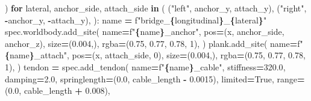 \documentclass[
  american,
  11pt,
  letterpaper,
]{article}
\newenvironment{Shaded}{\begin{snugshade}}{\end{snugshade}}
\newcommand{\BuiltInTok}[1]{#1}
\newcommand{\ControlFlowTok}[1]{\textcolor[rgb]{0.13,0.29,0.53}{\textbf{#1}}}
\newcommand{\DecValTok}[1]{\textcolor[rgb]{0.00,0.00,0.81}{#1}}
\newcommand{\FloatTok}[1]{\textcolor[rgb]{0.00,0.00,0.81}{#1}}
\newcommand{\KeywordTok}[1]{\textcolor[rgb]{0.13,0.29,0.53}{\textbf{#1}}}
\newcommand{\NormalTok}[1]{#1}
\newcommand{\OperatorTok}[1]{\textcolor[rgb]{0.81,0.36,0.00}{\textbf{#1}}}
\newcommand{\SpecialCharTok}[1]{\textcolor[rgb]{0.81,0.36,0.00}{\textbf{#1}}}
\newcommand{\SpecialStringTok}[1]{\textcolor[rgb]{0.31,0.60,0.02}{#1}}
\newcommand{\StringTok}[1]{\textcolor[rgb]{0.31,0.60,0.02}{#1}}
\newcommand{\VariableTok}[1]{\textcolor[rgb]{0.00,0.00,0.00}{#1}}
\renewenvironment{Shaded}{\par\smallskip}{\par\smallskip}
\begin{document}
\begin{Shaded}
\begin{Highlighting}[]
\NormalTok{            )}
        \ControlFlowTok{for}\NormalTok{ lateral, anchor\_side, attach\_side }\KeywordTok{in}\NormalTok{ (}
\NormalTok{            (}\StringTok{"left"}\NormalTok{, anchor\_y, attach\_y),}
\NormalTok{            (}\StringTok{"right"}\NormalTok{, }\OperatorTok{{-}}\NormalTok{anchor\_y, }\OperatorTok{{-}}\NormalTok{attach\_y),}
\NormalTok{        ):}
\NormalTok{            name }\OperatorTok{=} \SpecialStringTok{f"bridge\_}\SpecialCharTok{\{}\NormalTok{longitudinal}\SpecialCharTok{\}}\SpecialStringTok{\_}\SpecialCharTok{\{}\NormalTok{lateral}\SpecialCharTok{\}}\SpecialStringTok{"}
\NormalTok{            spec.worldbody.add\_site(}
\NormalTok{                name}\OperatorTok{=}\SpecialStringTok{f"}\SpecialCharTok{\{}\NormalTok{name}\SpecialCharTok{\}}\SpecialStringTok{\_anchor"}\NormalTok{,}
\NormalTok{                pos}\OperatorTok{=}\NormalTok{(x, anchor\_side, anchor\_z),}
\NormalTok{                size}\OperatorTok{=}\NormalTok{(}\FloatTok{0.004}\NormalTok{,),}
\NormalTok{                rgba}\OperatorTok{=}\NormalTok{(}\FloatTok{0.75}\NormalTok{, }\FloatTok{0.77}\NormalTok{, }\FloatTok{0.78}\NormalTok{, }\DecValTok{1}\NormalTok{),}
\NormalTok{            )}
\NormalTok{            plank.add\_site(}
\NormalTok{                name}\OperatorTok{=}\SpecialStringTok{f"}\SpecialCharTok{\{}\NormalTok{name}\SpecialCharTok{\}}\SpecialStringTok{\_attach"}\NormalTok{,}
\NormalTok{                pos}\OperatorTok{=}\NormalTok{(x, attach\_side, }\DecValTok{0}\NormalTok{),}
\NormalTok{                size}\OperatorTok{=}\NormalTok{(}\FloatTok{0.004}\NormalTok{,),}
\NormalTok{                rgba}\OperatorTok{=}\NormalTok{(}\FloatTok{0.75}\NormalTok{, }\FloatTok{0.77}\NormalTok{, }\FloatTok{0.78}\NormalTok{, }\DecValTok{1}\NormalTok{),}
\NormalTok{            )}
\NormalTok{            tendon }\OperatorTok{=}\NormalTok{ spec.add\_tendon(}
\NormalTok{                name}\OperatorTok{=}\SpecialStringTok{f"}\SpecialCharTok{\{}\NormalTok{name}\SpecialCharTok{\}}\SpecialStringTok{\_cable"}\NormalTok{,}
\NormalTok{                stiffness}\OperatorTok{=}\FloatTok{320.0}\NormalTok{,}
\NormalTok{                damping}\OperatorTok{=}\FloatTok{2.0}\NormalTok{,}
\NormalTok{                springlength}\OperatorTok{=}\NormalTok{(}\FloatTok{0.0}\NormalTok{, cable\_length }\OperatorTok{{-}} \FloatTok{0.0015}\NormalTok{),}
\NormalTok{                limited}\OperatorTok{=}\VariableTok{True}\NormalTok{,}
                \BuiltInTok{range}\OperatorTok{=}\NormalTok{(}\FloatTok{0.0}\NormalTok{, cable\_length }\OperatorTok{+} \FloatTok{0.008}\NormalTok{),}

\end{Highlighting}
\end{Shaded}
\end{document}
